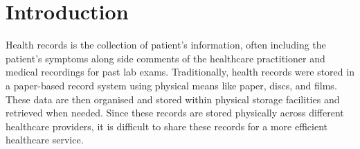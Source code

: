 \documentclass{l4proj}
\begin{document}
%
%
%
%
%
%
%
%
\graphicspath{ {./images/} }

\chapter{Introduction}

Health records is the collection of patient's information, often including the patient's symptoms along side comments of the healthcare practitioner and medical recordings for past lab exams. Traditionally, health records were stored in a paper-based record system using physical means like paper, discs, and films. These data are then organised and stored within physical storage facilities and retrieved when needed. Since these records are stored physically across different healthcare providers, it is difficult to share these records for a more efficient healthcare service.  
\end{document}
